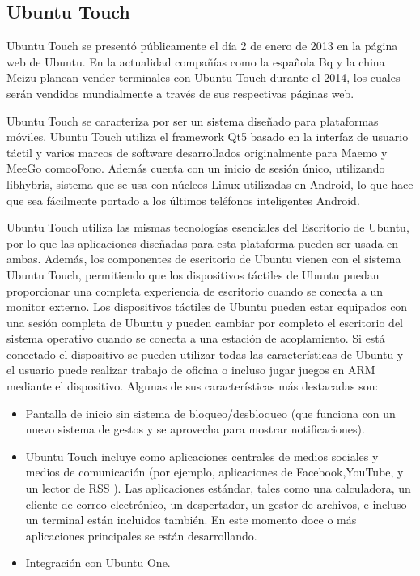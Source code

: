 \subsection*{Ubuntu Touch}
Ubuntu Touch se presentó públicamente el día 2 de enero de 2013 en la página web de Ubuntu. En la actualidad compañías como la española Bq y la china Meizu planean vender 
terminales con Ubuntu Touch durante el 2014, los cuales serán vendidos mundialmente a través de sus respectivas páginas web.

Ubuntu Touch se caracteriza por ser un sistema diseñado para plataformas móviles. Ubuntu Touch utiliza el framework Qt5 basado en la interfaz de usuario táctil y varios marcos de 
software desarrollados originalmente para Maemo y MeeGo comooFono. Además cuenta con un inicio de sesión único, utilizando libhybris, sistema que se usa con núcleos Linux 
utilizadas en Android, lo que hace que sea fácilmente portado a los últimos teléfonos inteligentes Android.

Ubuntu Touch utiliza las mismas tecnologías esenciales del Escritorio de Ubuntu, por lo que las aplicaciones diseñadas para esta plataforma pueden ser usada en ambas. Además, los 
componentes de escritorio de Ubuntu vienen con el sistema Ubuntu Touch, permitiendo que los dispositivos táctiles de Ubuntu puedan proporcionar una completa experiencia de 
escritorio cuando se conecta a un monitor externo. Los dispositivos táctiles de Ubuntu pueden estar equipados con una sesión completa de Ubuntu y pueden cambiar por completo el 
escritorio del sistema operativo cuando se conecta a una estación de acoplamiento. Si está conectado el dispositivo se pueden utilizar todas las características de Ubuntu y el 
usuario puede realizar trabajo de oficina o incluso jugar juegos en ARM mediante el dispositivo. Algunas de sus características más destacadas son:
\begin{itemize}
	\item Pantalla de inicio sin sistema de bloqueo/desbloqueo (que funciona con un nuevo sistema de gestos y se aprovecha para mostrar notificaciones).
	\item Ubuntu Touch incluye como aplicaciones centrales de medios sociales y medios de comunicación (por ejemplo, aplicaciones de Facebook,YouTube, y un lector de RSS ). Las 		
			aplicaciones estándar, tales como una calculadora, un cliente de correo electrónico, un despertador, un gestor de archivos, e incluso un terminal están incluidos 		
			también. En este momento doce o más aplicaciones principales se están desarrollando.
	\item Integración con Ubuntu One.
\end{itemize}


